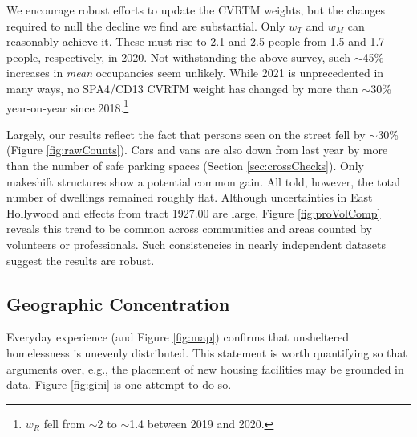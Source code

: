 \documentclass[11pt,twocolumn]{article}
\def\resp{respectively}
\begin{document}

We encourage robust efforts to update the CVRTM weights, but the changes required to null the decline we find
are substantial. Only $w_{T}$ and $w_{M}$ can reasonably achieve it. These must rise to 2.1 and 
2.5 people from 1.5 and 1.7 people, \resp, in 2020. Not withstanding the above survey, such $\sim$45\% increases 
in {\it mean} occupancies seem unlikely. While 2021 is unprecedented in many ways, no SPA4/CD13 
CVRTM weight has changed by more than $\sim$30\% year-on-year since 2018.\footnote{$w_{R}$ fell from 
$\sim$2 to $\sim$1.4 between 2019 and 2020.}

Largely, our results reflect the fact that persons seen on the street fell by $\sim$30\% (Figure 
\ref{fig:rawCounts}). Cars and vans are also down from last year by more than the number of 
safe parking spaces (Section \ref{sec:crossChecks}). Only makeshift structures show a potential 
common gain. All told, however, the total number of dwellings remained roughly flat. Although 
uncertainties in East Hollywood and effects from tract 1927.00 are large, Figure \ref{fig:proVolComp} 
reveals this trend to be common across communities and areas counted by volunteers or professionals. 
Such consistencies in nearly independent datasets suggest the results are robust. 


\subsection{Geographic Concentration}
\label{sec:concentration}

Everyday experience (and Figure \ref{fig:map}) confirms that unsheltered homelessness is
unevenly distributed. This statement is worth quantifying so that arguments over, e.g., the 
placement of new housing facilities may be grounded in data. Figure \ref{fig:gini} is one attempt to 
do so. 
\end{document}
